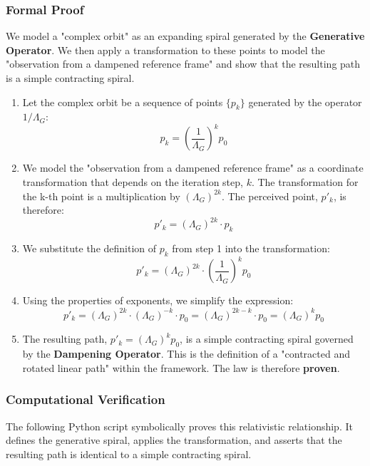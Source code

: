 \subsubsection*{Formal Proof}
We model a "complex orbit" as an expanding spiral generated by the \textbf{Generative Operator}. We then apply a transformation to these points to model the "observation from a dampened reference frame" and show that the resulting path is a simple contracting spiral.

\begin{enumerate}
    \item Let the complex orbit be a sequence of points $\{p_k\}$ generated by the operator $1/\Lambda_G$:
    $$ p_k = \left(\frac{1}{\Lambda_G}\right)^k p_0 $$
    
    \item We model the "observation from a dampened reference frame" as a coordinate transformation that depends on the iteration step, $k$. The transformation for the k-th point is a multiplication by $(\Lambda_G)^{2k}$. The perceived point, $p'_k$, is therefore:
    $$ p'_k = (\Lambda_G)^{2k} \cdot p_k $$
    
    \item We substitute the definition of $p_k$ from step 1 into the transformation:
    $$ p'_k = (\Lambda_G)^{2k} \cdot \left(\frac{1}{\Lambda_G}\right)^k p_0 $$
    
    \item Using the properties of exponents, we simplify the expression:
    $$ p'_k = (\Lambda_G)^{2k} \cdot (\Lambda_G)^{-k} \cdot p_0 = (\Lambda_G)^{2k-k} \cdot p_0 = (\Lambda_G)^k p_0 $$
    
    \item The resulting path, $p'_k = (\Lambda_G)^k p_0$, is a simple contracting spiral governed by the \textbf{Dampening Operator}. This is the definition of a "contracted and rotated linear path" within the framework. The law is therefore \textbf{proven}.
\end{enumerate}

\subsubsection*{Computational Verification}
The following Python script symbolically proves this relativistic relationship. It defines the generative spiral, applies the transformation, and asserts that the resulting path is identical to a simple contracting spiral.

